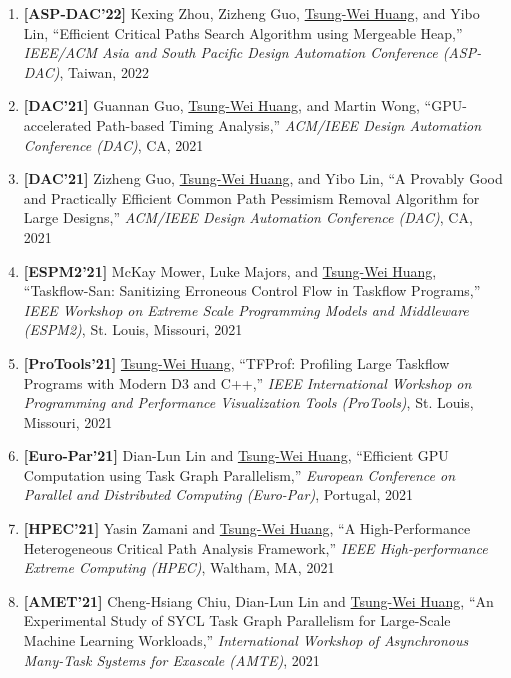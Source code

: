 \documentclass[A4,11pt]{article}
\begin{document}
\begin{enumerate}
    \item \textbf{[ASP-DAC'22]} Kexing Zhou, Zizheng Guo, \underline{Tsung-Wei Huang}, and Yibo Lin, ``Efficient Critical Paths Search Algorithm using Mergeable Heap,'' \textit{IEEE/ACM Asia and South Pacific Design Automation Conference (ASP-DAC)}, Taiwan, 2022

    \item \textbf{[DAC'21]} Guannan Guo, \underline{Tsung-Wei Huang}, and Martin Wong, ``GPU-accelerated Path-based Timing Analysis,'' \textit{ACM/IEEE Design Automation Conference (DAC)}, CA, 2021

    \item \textbf{[DAC'21]} Zizheng Guo, \underline{Tsung-Wei Huang}, and Yibo Lin, ``A Provably Good and Practically Efficient Common Path Pessimism Removal Algorithm for Large Designs,'' \textit{ACM/IEEE Design Automation Conference (DAC)}, CA, 2021

    \item \textbf{[ESPM2'21]} McKay Mower, Luke Majors, and \underline{Tsung-Wei Huang}, ``Taskflow-San: Sanitizing Erroneous Control Flow in Taskflow Programs,'' \textit{IEEE Workshop on Extreme Scale Programming Models and Middleware (ESPM2)}, St. Louis, Missouri, 2021

    \item \textbf{[ProTools'21]} \underline{Tsung-Wei Huang}, ``TFProf: Profiling Large Taskflow Programs with Modern D3 and C++,'' \textit{IEEE International Workshop on Programming and Performance Visualization Tools (ProTools)}, St. Louis, Missouri, 2021

    \item \textbf{[Euro-Par'21]} Dian-Lun Lin and \underline{Tsung-Wei Huang}, ``Efficient GPU Computation using Task Graph Parallelism,'' \textit{European Conference on Parallel and Distributed Computing (Euro-Par)}, Portugal, 2021

    \item \textbf{[HPEC'21]} Yasin Zamani and \underline{Tsung-Wei Huang}, ``A High-Performance Heterogeneous Critical Path Analysis Framework,'' \textit{IEEE High-performance Extreme Computing (HPEC)}, Waltham, MA, 2021
    
    \item \textbf{[AMET'21]} Cheng-Hsiang Chiu, Dian-Lun Lin and \underline{Tsung-Wei Huang}, ``An Experimental Study of SYCL Task Graph Parallelism for Large-Scale Machine Learning Workloads,'' \textit{International Workshop of Asynchronous Many-Task Systems for Exascale (AMTE)}, 2021


\end{enumerate}
\end{document}
